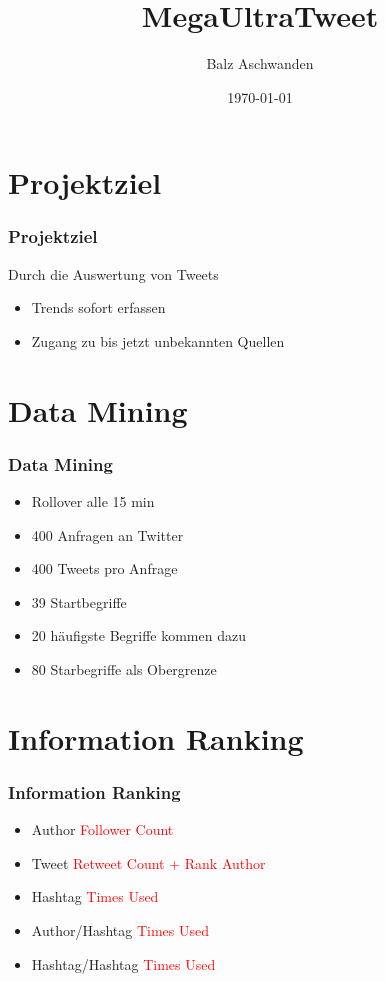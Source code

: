 \documentclass{beamer}
\title{MegaUltraTweet}
\author{Balz Aschwanden}
\date{\today}
\begin{document}
\frame{\titlepage} 

\section{Projektziel}
\begin{frame}
  \frametitle{Projektziel}
  Durch die Auswertung von Tweets \pause
  \begin{itemize}
    \item Trends sofort erfassen \pause
    \item Zugang zu bis jetzt unbekannten Quellen
  \end{itemize}
\end{frame}

\section{Data Mining}
\begin{frame}
  \frametitle{Data Mining} \pause
  \begin{itemize}
    \item Rollover alle 15 min \pause
    \item 400 Anfragen an Twitter \pause
    \item 400 Tweets pro Anfrage \pause
    \item 39 Startbegriffe \pause
    \item 20 häufigste Begriffe kommen dazu \pause
    \item 80 Starbegriffe als Obergrenze
  \end{itemize}
\end{frame}

\section{Information Ranking}
\begin{frame}
  \frametitle{Information Ranking} \pause
  \begin{itemize}
    \item Author \pause \textcolor{red}{Follower Count} \pause
    \item Tweet \pause \textcolor{red}{Retweet Count + Rank Author} \pause
    \item Hashtag \pause \textcolor{red}{Times Used} \pause
    \item Author/Hashtag \textcolor{red}{Times Used}
    \item Hashtag/Hashtag \textcolor{red}{Times Used}
  \end{itemize}
\end{frame}
\end{document}

